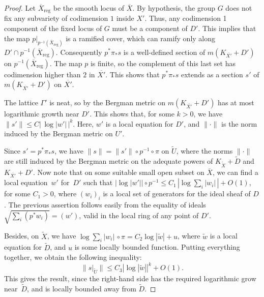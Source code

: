 \documentclass[10pt]{amsart}
\theoremstyle{plain}
\theoremstyle{definition}
\numberwithin{equation}{theorem}
\newcommand{\abs}[1]{ {\left| #1 \right| } }
\newcommand{\norm}[1] { \| #1 \| }
\begin{document}
\begin{proof}

Let $\overline{X}_{\mathrm{reg}}$ be the smooth locus of $\overline{X}$. By hypothesis, the group $G$ does not fix any subvariety of codimension $1$ inside $X'$. Thus, any codimension 1 component of the fixed locus of $G$ must be a component of $D'$. This implies that the map $p|_{p^{-1} (\overline{X}_{\mathrm{reg}})}$ is a ramified cover, which can ramify only along $D'\cap p^{-1}(\overline{X}_{\mathrm{reg}})$. Consequently $p^\ast \pi_\ast s$ is a well-defined section of $m( K_{\overline{X'}} + D')$ on $p^{-1}(\overline{X}_{\mathrm{reg}})$. The map $p$ is finite, so the complement of this last set has codimension higher than $2$ in $\overline{X'}$. This shows that $p^\ast \pi_\ast s$ extends as a section $s'$ of $m( K_{\overline{X'}} + D')$ on $\overline{X'}$.

The lattice $\Gamma'$ is neat, so by \cite{Mum77} the Bergman metric on $m(K_{\overline{X'}} + D')$ has at most logarithmic growth near $D'$. This shows that, for some $k > 0$, we have $\norm{s'} \leq C |\, \log |w'| \,| ^k$. Here, $w'$ is a local equation for $D'$, and $\norm{\cdot}$ is the norm induced by the Bergman metric on $U'$.

Since $s' = p^\ast \pi_\ast s$, we have $\norm{s} = \norm{s'} \circ p^{-1} \circ \pi$ on $\widetilde{U}$, where the norms $\norm{\cdot}$ are still induced by the Bergman metric on the adequate powers of $K_{\widetilde{X}} + \widetilde{D}$ and $K_{\overline{X'}} + D'$. Now note that on some suitable small open subset on $\overline{X}$, we can find a local equation~$w'$ for~$D'$ such that $\left| \log |w'| \right| \circ p^{-1} \leq C_1 \, \left| \log \sum_i |w_i| \, \right| + O(1)$, for some $C_1 > 0$, where $(w_i)_i$ is a local set of generators for the ideal sheaf of $D$. The previous assertion follows easily from the equality of ideals $\sqrt{\sum_i \left( p^\ast w_i \right)} = \left( w' \right)$, valid in the local ring of any point of $D'$.

Besides, on $\widetilde{X}$, we have $ \log \sum_i |w_i| \, \circ \pi = C_2 \log |\widetilde{w}| + u$, where $\widetilde{w}$ is a local equation for $\widetilde{D}$, and $u$ is some locally bounded function. Putting everything together, we obtain the following inequality:
$$
\norm{ \left. s \right|_{\widetilde{U}} } \leq C_3 \abs{ \log \abs{\widetilde{w}}}^k + O(1).
$$
This gives the result, since the right-hand side has the required logarithmic grow near~$\widetilde{D}$, and is locally bounded away from $\widetilde{D}$.
\end{proof}
\end{document}
